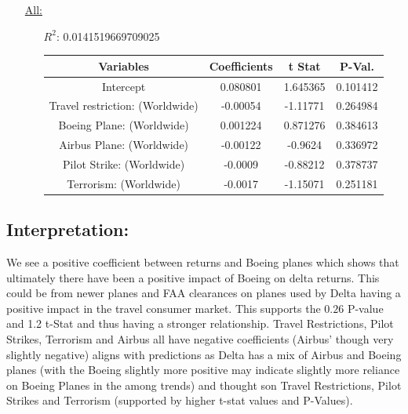 \documentclass[12pt]{report}
\begin{document}
\begin{enumerate}
\begin{enumerate}
        \end{enumerate}
    \item[\underline{All:}]
    \begin{samepage}

        \begin{enumerate}
            \item[$R^2$:]0.0141519669709025
            \item[]


                \begin{tabular}{|c|c|c|c|}
                    \toprule \hline
                    \textbf{Variables} & \textbf{Coefficients} & \textbf{t Stat} &\textbf{P-Val.}\\ \hline

                    Intercept & 0.080801 & 1.645365&0.101412 \\ \hline
                    Travel restriction: (Worldwide) & -0.00054 & -1.11771 &0.264984 \\ \hline
                    Boeing Plane: (Worldwide) & 0.001224 & 0.871276& 0.384613 \\ \hline
                    Airbus Plane: (Worldwide) & -0.00122 & -0.9624 &0.336972 \\ \hline
                    Pilot Strike: (Worldwide) & -0.0009 & -0.88212 &0.378737 \\ \hline
                    Terrorism: (Worldwide) & -0.0017 & -1.15071&0.251181 \\ \hline
                    \bottomrule
                \end{tabular}





        \end{enumerate}
        \end{samepage}
\end{enumerate}
\subsection*{Interpretation:}
We see a positive coefficient between returns and Boeing planes which shows that ultimately there have been a positive impact of Boeing on delta returns.
This could be from newer planes and FAA clearances on planes used by Delta having a positive impact in the travel consumer market.
This supports the $0.26$ P-value and 1.2 t-Stat and thus having a stronger relationship.
Travel Restrictions, Pilot Strikes, Terrorism and Airbus all have negative coefficients (Airbus' though very slightly negative)
aligns with predictions as Delta has a mix of Airbus and Boeing planes (with the Boeing slightly more positive may indicate slightly more reliance on Boeing Planes in the among trends)
and thought son Travel Restrictions, Pilot Strikes and Terrorism (supported by higher t-stat values and P-Values).
\newpage
\end{document}
